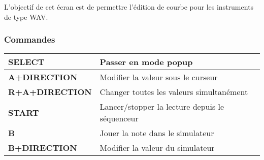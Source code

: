\label{subsec:customwave}

L'objectif de cet écran est de permettre l'édition de courbe pour les instruments de type WAV.



\subsubsection{Commandes}
\tablelasttail{\hline}
\begin{supertabular}{|l|p{11cm}|}
    \hline
    {\bf SELECT} & Passer en mode popup \\
    \hline
    {\bf A+DIRECTION} & Modifier la valeur sous le curseur \\
    \hline
    {\bf R+A+DIRECTION} & Changer toutes les valeurs simultanément \\
    \hline
    {\bf START} & Lancer/stopper la lecture depuis le séquenceur \\
    \hline
    {\bf B} & Jouer la note dans le simulateur \\
    \hline
    {\bf B+DIRECTION} & Modifier la valeur du simulateur \\
\end{supertabular}
